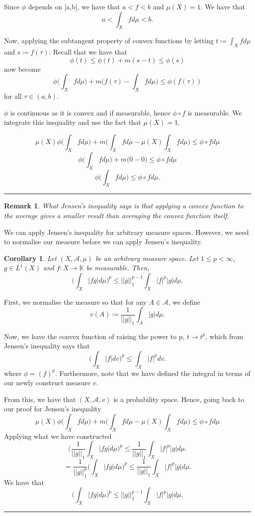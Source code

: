 \documentclass[twoside]{article}
\newtheorem{corollary}[theorem]{Corollary}
\newtheorem{remark}[theorem]{Remark}
\newenvironment{proof}{{\bf Proof:}}{\hfill\rule{2mm}{2mm}}
\begin{document}
\begin{proof} Since $\phi$ depends on [a,b], we have that $a < f < b$ and $\mu(X) = 1$. We have that
$$
a < \int_Xfd\mu < b.
$$

Now, applying the subtangent property of convex functions by letting $t \coloneqq \int_Xfd\mu$ and $s \coloneqq f(\tau)$. Recall that we have that
$$
\phi(t) \leq \phi(t) + m(s-t) \leq \phi(s)
$$
now become
$$
\phi\big(\int_Xfd\mu\big) + m\big(f(\tau) - \int_Xfd\mu\big) \leq \phi(f(\tau))
$$
for all $\tau \in (a,b)$. 

$\phi$ is continuous as it is convex and if measurable, hence $\phi \circ f$ is measurable. We integrate this inequality and use the fact that $\mu(X) = 1$.

$$
\mu(X)\phi\big(\int_Xfd\mu\big) + m\big(\int_Xfd\mu - \mu(X)\int_Xfd\mu\big) \leq \phi \circ f d\mu
$$
$$
\phi\big(\int_Xfd\mu\big) + m\big(0 - 0) \leq \phi \circ f d\mu
$$
$$
\phi\big(\int_Xfd\mu\big) \leq \phi \circ f d\mu.
$$
\end{proof}

\begin{remark}What Jensen's inequality says is that applying a convex function to the average gives a smaller result than averaging the convex function itself.
\end{remark}

We can apply Jensen's inequality for arbitrary measure spaces. However, we need to normalise our measure before we can apply Jensen's inequality.

\begin{corollary}Let $(X, \mathcal{A}, \mu)$ be an arbitrary measure space. Let $1 \leq p < \infty$, $g \in L^1(X)$ and $f: X \rightarrow \mathbb{K}$ be measurable. Then,
$$
\big(\int_X|fg|d\mu\big)^p \leq ||g||_1^{p-1}\int_X|f|^p|g|d\mu.
$$
\end{corollary}

\begin{proof} First, we normalise the measure so that for any $A \in \mathcal{A}$, we define 
$$
\textit{v}(A) \coloneqq \frac{1}{||g||_1}\int_A|g|d\mu.
$$

Now, we have the convex function of raising the power to p, $t \rightarrow t^p$, which from Jensen's inequality says that
$$
\big(\int_X|f|d \textit{v}\big)^p \leq \int_X|f|^pd\textit{v}.
$$
where $\phi = (f)^p$. Furthermore, note that we have defined the integral in terms of our newly construct measure $\textit{v}$.

From this, we have that $(X, \mathcal{A}, \textit{v})$ is a probability space. Hence, going back to our proof for Jensen's inequality
$$
\mu(X)\phi\big(\int_Xfd\mu\big) + m\big(\int_Xfd\mu - \mu(X)\int_Xfd\mu\big) \leq \phi \circ f d\mu
$$
Applying what we have constructed
$$
\big(\frac{1}{||g||_1}\int_X|fg|d\mu\big)^p \leq \frac{1}{||g||_1} \int_X |f|^p|g| d\mu.
$$
$$
= \frac{1}{||g||_1^p}\big(\int_X|fg|d\mu\big)^p \leq \frac{1}{||g||_1} \int_X |f|^p|g| d\mu.
$$
We have that
$$
\big(\int_X|fg|d\mu\big)^p \leq ||g||_1^{p-1}\int_X|f|^p|g|d\mu.
$$
\end{proof}
\end{document}
